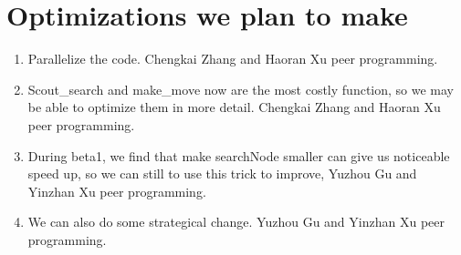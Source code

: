 \documentclass[10pt,twosidep]{article}
\begin{document}
\section{Optimizations we plan to make}

\begin{enumerate}
	\item Parallelize the code. Chengkai Zhang and Haoran Xu peer programming. 
	
	\item Scout\_search and make\_move now are the most costly function, so we may be able to optimize them in more detail. Chengkai Zhang and Haoran Xu peer programming. 
	
	\item During beta1, we find that make searchNode smaller can give us noticeable speed up, so we can still to use this trick to improve, Yuzhou Gu and Yinzhan Xu peer programming. 
	
	\item We can also do some strategical change. Yuzhou Gu and Yinzhan Xu peer programming. 
\end{enumerate}
\end{document}
